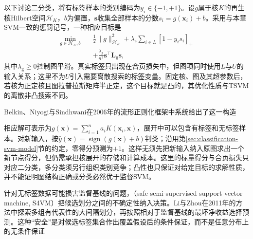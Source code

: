以下讨论二分类，将有标签样本的类别编码为$y_i\in\{-1,+1\}$。设$g$属于核$K$的再生核Hilbert空间$\mathcal{H}_K$，$b$为偏置，$\bm{s}$收集全部样本的分数$s_i=g(\bm{x}_i)+b$。采用与本章SVM一致的惩罚记号，一种相应目标是
\begin{equation}
  \label{eq:classification-laplacian-svm}
  \begin{aligned}
    \min_{g\in\mathcal{H}_K,b}\quad
      &\frac12\lVert g\rVert_{\mathcal{H}_K}^2
       +\lambda_{\mathrm{s}}\sum_{i\in L}[1-y_i s_i]_+\\
      &+\frac{\lambda_{\mathrm{g}}}{n^2}
        \bm{s}^{\top}\bm{L}_{\mathrm{g}}\bm{s},
  \end{aligned}
\end{equation}
其中$\lambda_{\mathrm{g}}\geq0$控制图平滑。真实标签只出现在合页损失中，但图项同时使用$L$与$U$的输入关系；这里不为$U$引入需要离散搜索的标签变量。固定核、图及其超参数后，若核为正定核且图拉普拉斯矩阵半正定，这个目标就是凸的，其优化性质与TSVM的离散非凸搜索不同。

Belkin、Niyogi与Sindhwani在2006年的流形正则化框架中系统给出了这一构造

相应解可表示为$g(\bm{x})=\sum_{i=1}^{n}a_iK(\bm{x}_i,\bm{x})$，展开中可以包含有标签和无标签样本。对新输入，按$\hat y(\bm{x})=\operatorname{sign}(g(\bm{x})+b)$判类；沿用第\ref{sec:classification-svm-model}节的约定，零得分预测为$+1$。这样无须先把新输入纳入原图求出一个新节点得分，但仍需承担核展开的存储和计算成本。这里的标量得分与合页损失只对应二分类，多分类须另行组织类别竞争；凸性也只保证对给定目标的求解性质，并不能证明图结构正确或分类必然优于监督SVM。

针对无标签数据可能损害监督基线的问题，（safe semi-supervised support vector machine, S4VM）把候选划分之间的不确定性纳入决策。Li与Zhou在2011年的方法中探索多组有代表性的大间隔划分，再按照相对于监督基线的最坏净收益选择预测。这种“安全”是对候选标签集合作出覆盖假设后的条件保证，而不是任意分布上的无条件保证

